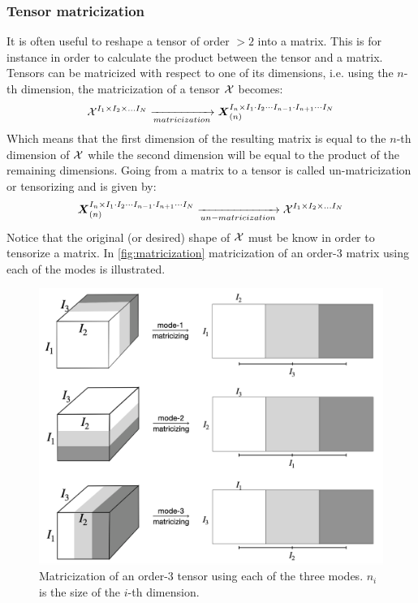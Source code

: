 \subsubsection{Tensor matricization}
It is often useful to reshape a tensor of order $> 2$ into a matrix. This is for instance in order to calculate the product between the tensor and a matrix. Tensors can be matricized with respect to one of its dimensions, i.e. using the $n$-th dimension, the matricization of a tensor $\mathcal{X}$ becomes:
\begin{equation}
    \mathcal{X}^{I_1 \times I_2 \times \dots I_N} \xrightarrow[matricization]{} \boldsymbol{X}_{(n)}^{I_n \times I_1 \cdot I_2 \cdots I_{n-1} \cdot I_{n+1} \cdots I_N}
\end{equation}
Which means that the first dimension of the resulting matrix is equal to the $n$-th dimension of $\mathcal{X}$ while the second dimension will be equal to the product of the remaining dimensions. Going from a matrix to a tensor is called un-matricization or tensorizing and is given by:
\begin{equation}
      \boldsymbol{X}_{(n)}^{I_n \times I_1 \cdot I_2 \cdots I_{n-1} \cdot I_{n+1} \cdots I_N} \xrightarrow[un-matricization]{} \mathcal{X}^{I_1 \times I_2 \times \dots I_N}
\end{equation}
Notice that the original (or desired) shape of $\mathcal{X}$ must be know in order to tensorize a matrix. In \autoref{fig:matricization} matricization of an order-3 matrix using each of the modes is illustrated.
\begin{figure}
    \centering
    \captionsetup{width=.6\linewidth}
    \includegraphics[width=.6\linewidth]{Pics/02_Theory/matricization.png}
    \caption{Matricization of an order-3 tensor using each of the three modes. $n_i$ is the size of the $i$-th dimension.}
    \label{fig:matricization}
\end{figure}

